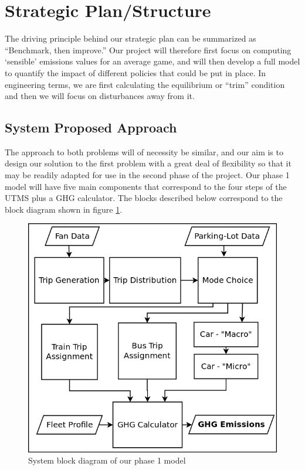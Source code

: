 \documentclass[draft,12pt,titlepage]{article}
\begin{document}
\section{Strategic Plan/Structure}
The driving principle behind our strategic plan can be summarized as ``Benchmark, then
improve.'' Our project will therefore first focus on computing `sensible' emissions values for
an average game, and will then develop a full model to quantify the impact of different
policies that could be put in place. In engineering terms, we are first calculating the
equilibrium or ``trim'' condition and then we will focus on disturbances away from it.
\subsection{System Proposed Approach}
The approach to both problems will of necessity be similar, and our aim is to design our
solution to the first problem with a great deal of flexibility so that it may be readily adapted
for use in the second phase of the project. Our phase 1 model will have five main components
that correspond to the four steps of the UTMS plus a GHG calculator. The blocks described
below correspond to the block diagram shown in figure \ref{mainsystem1}.

\begin{figure}[htp]
  \centering
  \includegraphics[width=.3\textwidth]{fullsystem1.png}
  \caption{System block diagram of our phase 1 model}
  \label{mainsystem1}
\end{figure}
\end{document}
